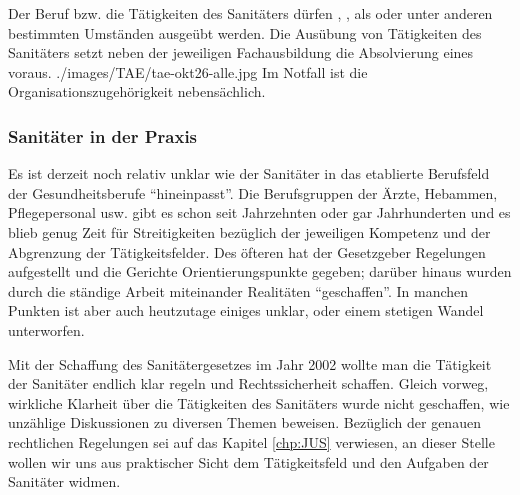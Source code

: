{Der Beruf bzw. die Tätigkeiten des Sanitäters
dürfen , , als
 oder unter anderen bestimmten
Umständen ausgeübt werden. Die
 Ausübung von Tätigkeiten des Sanitäters
setzt neben der jeweiligen Fachausbildung die Absolvierung
eines  voraus. 
}
{}
{./images/TAE/tae-okt26-alle.jpg} {Im Notfall ist die
Organisationszugehörigkeit nebensächlich.} {}





\subsubsection{Sanitäter in der Praxis}

Es ist derzeit noch relativ unklar wie der Sanitäter in das
etablierte Berufsfeld der Gesundheitsberufe \enquote{hineinpasst}.
Die Berufsgruppen der Ärzte, Hebammen, Pflegepersonal usw.
gibt es schon seit Jahrzehnten oder gar Jahrhunderten und es
blieb genug Zeit für Streitigkeiten bezüglich der jeweiligen
Kompetenz und der Abgrenzung der Tätigkeitsfelder. Des
öfteren hat der Gesetzgeber Regelungen aufgestellt und die
Gerichte Orientierungspunkte gegeben; darüber hinaus wurden
durch die ständige Arbeit miteinander Realitäten
\enquote{geschaffen}. In manchen Punkten ist aber auch heutzutage
einiges unklar, oder einem stetigen Wandel unterworfen.

{Mit der Schaffung des
Sanitätergesetzes im Jahr 2002 wollte man die Tätigkeit der
Sanitäter endlich klar regeln und Rechtssicherheit schaffen.
Gleich vorweg, wirkliche Klarheit über die Tätigkeiten des
Sanitäters wurde nicht geschaffen, wie unzählige Diskussionen
zu diversen Themen beweisen. Bezüglich der genauen
rechtlichen Regelungen sei auf das Kapitel \ref{chp:JUS}
verwiesen, an dieser Stelle wollen wir uns aus praktischer
Sicht dem Tätigkeitsfeld und den Aufgaben der Sanitäter
widmen. 
}{}{}{}{}

